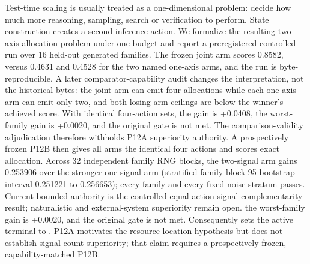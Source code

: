 \markdownRendererDocumentBegin
Test-time scaling is usually treated as a one-dimensional problem: decide how much more reasoning, sampling, search or verification to perform. State construction creates a second inference action. We formalize the resulting two-axis allocation problem under one budget and report a preregistered controlled run over 16 held-out generated families. The frozen joint arm scores 0.8582, versus 0.4631 and 0.4528 for the two named one-axis arms, and the run is byte-reproducible. A later comparator-capability audit changes the interpretation, not the historical bytes: the joint arm can emit four allocations while each one-axis arm can emit only two, and both losing-arm ceilings are below the winner's achieved score. With identical four-action sets, the gain is +0.0408, the worst-family gain is +0.0020, and the original gate is not met. The comparison-validity adjudication therefore withholds P12A superiority authority. A prospectively frozen P12B then gives all arms the identical four actions and scores exact allocation. Across 32 independent family RNG blocks, the two-signal arm gains 0.253906 over the stronger one-signal arm (stratified family-block 95\markdownRendererPercentSign{} bootstrap interval 0.251221 to 0.256653); every family and every fixed noise stratum passes. Current bounded authority is the controlled equal-action signal-complementarity result; naturalistic and external-system superiority remain open. the worst-family gain is +0.0020, and the original gate is not met. Consequently  sets the active terminal to . P12A motivates the resource-location hypothesis but does not establish signal-count superiority; that claim requires a prospectively frozen, capability-matched P12B.\markdownRendererDocumentEnd